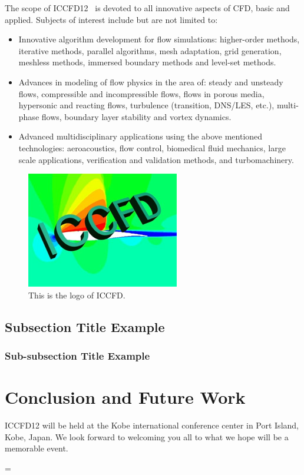 \documentclass[10pt]{article}
\newcommand{\lafi}[1]{\label{fig:#1}}
\begin{document}
  The scope of ICCFD12~\cite{web} is devoted to all innovative aspects of CFD, basic and applied.  Subjects of interest include but are not limited
to: 
\begin{itemize}

    \item Innovative algorithm development for flow simulations: higher-order methods, iterative methods, parallel
          algorithms, mesh adaptation, grid generation, meshless methods, immersed boundary methods and level-set
          methods. 
          
    \item Advances in modeling of flow physics in the area of: steady and unsteady flows, compressible and incompressible 
          flows, flows in porous media, hypersonic and reacting flows, turbulence (transition, DNS/LES, etc.), multi-phase 
          flows, boundary layer stability and vortex dynamics. 
          
    \item Advanced multidisciplinary applications using the above mentioned technologies: aeroacoustics, flow
          control, biomedical fluid mechanics, large scale applications, verification and validation methods, and
          turbomachinery. 
          
\end{itemize}

\begin{figure}[t]
  \centering 
  \includegraphics[height=2.0in]{exampleFigure.jpg}
  \caption{This is the logo of ICCFD.}
  \lafi{logo}
\end{figure}


\subsection{Subsection Title Example}


\subsubsection{Sub-subsection Title Example}


\section{Conclusion and Future Work}
ICCFD12 will be held at the Kobe international conference center in Port Island, Kobe, Japan. We look forward to welcoming you all to what we hope will be a memorable event.


\bibspacing=
 

\end{document}
